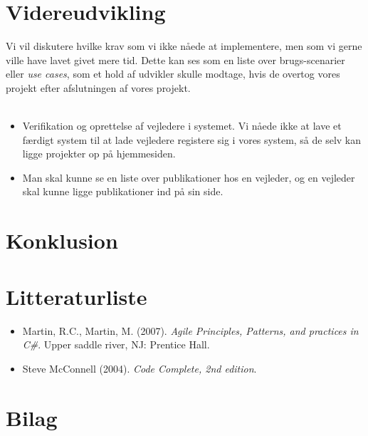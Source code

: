 \documentclass[12pt]{article}
\begin{document}
\section{Videreudvikling}
\label{sec:udvikling}
Vi vil diskutere hvilke krav som vi ikke nåede at implementere, men som vi gerne ville have lavet givet mere tid. Dette kan ses som en liste over brugs-scenarier eller \textit{use cases}, som et hold af udvikler skulle modtage, hvis de overtog vores projekt efter afslutningen af vores projekt. \\ \\
\begin{itemize}
\item Verifikation og oprettelse af vejledere i systemet. Vi nåede ikke at lave et færdigt system til at lade vejledere registere sig i vores system, så de selv kan ligge projekter op på hjemmesiden.
\item Man skal kunne se en liste over publikationer hos en vejleder, og en vejleder skal kunne ligge publikationer ind på sin side.
\end{itemize}

\section{Konklusion}
\label{sec:konklusion}

\section{Litteraturliste}
\label{sec:litteratur}
\begin{itemize}
\item Martin, R.C., Martin, M. (2007). \textit{Agile Principles, Patterns, and practices in C\#}. Upper saddle river, NJ: Prentice Hall.
\item Steve McConnell (2004). \textit{Code Complete, 2nd edition}.
\end{itemize}

\section{Bilag}
\label{sec:bilag}
\end{document}
